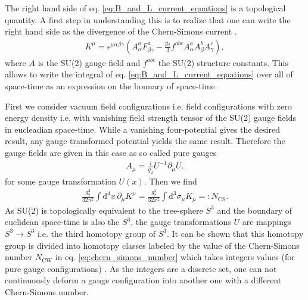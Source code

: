 \documentclass[13pt,a4paper,twoside,titlepage]{article}
\begin{document}
The right hand side of eq. \eqref{eq:B_and_L_current_equations} is a topological quantity.
A first step in understanding this is to realize that one can write the right hand side as the divergence of the Chern-Simons current \cite[eq. 4.2, 4.3]{Cline:2006ts_Baryogenesis}.
\begin{align}
    \label{eq:chern_simons_current}
    K^\mu = \epsilon^{\mu \alpha \beta \gamma} \left( A^a_\alpha F^a_{\beta \gamma} - \frac{g_2}{3} f^{abc} A^a_\alpha A^b_\beta A^c_\gamma \right),
\end{align}
where $A$ is the SU(2) gauge field and $f^{abc}$ the SU(2) structure constants.
This allows to write the integral of eq. \eqref{eq:B_and_L_current_equations}
over all of space-time as an expression on the bounary of space-time.

\noindent
First we consider vacuum field configurations i.e. field configurations with zero energy density i.e. with vanishing field strength tensor of the SU(2) gauge fields in eucleadian space-time. While a vanishing four-potential gives the desired result, any gauge transformed potential yields the same result.
Therefore the gauge fields are given in this case as so called pure gauges \cite[sec. 2.1]{Di_Luzio_2020_Landscape_of_QCD_Axion_models}
\begin{align}
    A_\mu = \frac{i}{g_2} U^{-1} \partial_\mu U.
\end{align}
for some gauge transformation $U(x)$.
Then we find
\begin{align}
    \label{eq:chern_simons_number}
    \frac{g_2^3}{32 \pi^2} \int \mathrm{d}^4 x \, \partial_\mu K^\mu =
    \frac{g_2^3}{32 \pi^2} \int \mathrm{d}^3 \sigma_\mu K_\mu
     =: N_{\mathrm{CS}}.
\end{align}
As SU(2) is topologically equivalent to the tree-sphere $S^3$ and the boundary of euclidean space-time is also the $S^3$, the gauge transformations $U$ are
mappings $S^3 \to S^3$ i.e. the third homotopy group of $S^3$.
It can be shown that this homotopy group is divided into homotopy classes labeled by the value of the Chern-Simons number $N_\mathrm{CW}$ in eq. \eqref{eq:chern_simons_number} which takes integers values (for pure gauge configurations) \cite{homotopy_spheres}.
As the integers are a discrete set, one can not continuously deform a gauge configuration into another one with a different Chern-Simons number.
\end{document}
